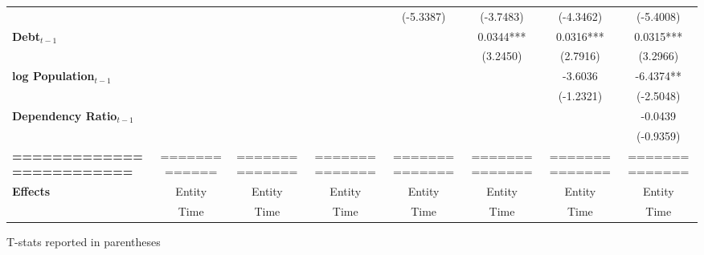 \begin{center}
\begin{tabular}{lccccccc}
\textbf{ }                         &                   &                      &                           &     (-5.3387)      &    (-3.7483)    &         (-4.3462)         &          (-5.4008)            \\
\textbf{Debt$_{t-1}$}                &                   &                      &                           &                    &    0.0344***    &         0.0316***         &          0.0315***            \\
\textbf{ }                         &                   &                      &                           &                    &     (3.2450)    &          (2.7916)         &           (3.2966)            \\
\textbf{log Population$_{t-1}$}      &                   &                      &                           &                    &                 &          -3.6036          &          -6.4374**            \\
\textbf{ }                         &                   &                      &                           &                    &                 &         (-1.2321)         &          (-2.5048)            \\
\textbf{Dependency Ratio$_{t-1}$}   &                   &                      &                           &                    &                 &                           &           -0.0439             \\
\textbf{ }                         &                   &                      &                           &                    &                 &                           &          (-0.9359)            \\
\textbf{=========================} &   =============   &    ==============    &       ==============      &   ==============   &  ============== &       ==============      &        ==============         \\
\textbf{Effects}                   &       Entity      &        Entity        &           Entity          &       Entity       &      Entity     &           Entity          &            Entity             \\
\textbf{}                          &        Time       &         Time         &            Time           &        Time        &       Time      &            Time           &             Time              \\
\bottomrule
\end{tabular}
\end{center}

T-stats reported in parentheses